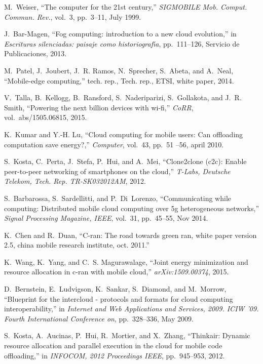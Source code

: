 \documentclass[12pt,journal,compsoc, onecolumn]{IEEEtran}
\begin{document}
\begin{thebibliography}{10}
	
	M.~Weiser, ``The computer for the 21st century,'' {\em SIGMOBILE Mob. Comput.
		Commun. Rev.}, vol.~3, pp.~3--11, July 1999.
	
	J.~Bar-Magen, ``Fog computing: introduction to a new cloud evolution,'' in {\em
		Escrituras silenciadas: paisaje como historiograf{\'\i}a}, pp.~111--126,
	Servicio de Publicaciones, 2013.
	
	M.~Patel, J.~Joubert, J.~R. Ramos, N.~Sprecher, S.~Abeta, and A.~Neal,
	``Mobile-edge computing,'' tech. rep., Tech. rep., ETSI, white paper, 2014.
	
	V.~Talla, B.~Kellogg, B.~Ransford, S.~Naderiparizi, S.~Gollakota, and J.~R.
	Smith, ``Powering the next billion devices with wi-fi,'' {\em CoRR},
	vol.~abs/1505.06815, 2015.
	
	K.~Kumar and Y.-H. Lu, ``Cloud computing for mobile users: Can offloading
	computation save energy?,'' {\em Computer}, vol.~43, pp.~51 --56, april 2010.
	
	S.~Kosta, C.~Perta, J.~Stefa, P.~Hui, and A.~Mei, ``Clone2clone (c2c): Enable
	peer-to-peer networking of smartphones on the cloud,'' {\em T-Labs, Deutsche
		Telekom, Tech. Rep. TR-SK032012AM}, 2012.
	
	S.~Barbarossa, S.~Sardellitti, and P.~Di~Lorenzo, ``Communicating while
	computing: Distributed mobile cloud computing over 5g heterogeneous
	networks,'' {\em Signal Processing Magazine, IEEE}, vol.~31, pp.~45--55, Nov
	2014.
	
	K.~Chen and R.~Duan, ``C-ran: The road towards green ran, white paper version
	2.5, china mobile research institute, oct. 2011.''
	
	K.~Wang, K.~Yang, and C.~S. Magurawalage, ``Joint energy minimization and
	resource allocation in c-ran with mobile cloud,'' {\em arXiv:1509.00374},
	2015.
	
	D.~Bernstein, E.~Ludvigson, K.~Sankar, S.~Diamond, and M.~Morrow, ``Blueprint
	for the intercloud - protocols and formats for cloud computing
	interoperability,'' in {\em Internet and Web Applications and Services, 2009.
		ICIW '09. Fourth International Conference on}, pp.~328--336, May 2009.
	
	S.~Kosta, A.~Aucinas, P.~Hui, R.~Mortier, and X.~Zhang, ``Thinkair: Dynamic
	resource allocation and parallel execution in the cloud for mobile code
	offloading,'' in {\em INFOCOM, 2012 Proceedings IEEE}, pp.~945--953, 2012.
	
\end{thebibliography}
\end{document}
